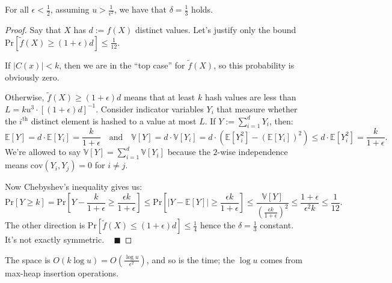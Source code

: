 \begin{claim}
    For all $\epsilon < \frac{1}{2}$, assuming $u > \frac{1}{\epsilon^2}$, we have that $\delta = \frac{1}{3}$ holds.
\end{claim}

\begin{proof}
    Say that $X$ has $d := f(X)$ distinct values.  Let's justify only the bound $\mathrm{Pr}\left [\tilde{f}(X) \geq (1 + \epsilon) d\right ] \leq \frac{1}{12}$.

    If $|C(x)| < k$, then we are in the ``top case'' for $\tilde{f}(X)$, so this probability is obviously zero.

    Otherwise, $\tilde{f}(X) \geq (1 + \epsilon) d$ means that at least $k$ hash values are less than $L = k u^3 \cdot \left [ (1 + \epsilon) d \right ]^{-1}$.  Consider indicator variables $Y_i$ that measure whether the $i^{\text{th}}$ distinct element is hashed to a value at most $L$.  If $Y := \sum_{i = 1}^d Y_i$, then:
    \[ \mathbb{E}[Y] = d \cdot \mathbb{E}[Y_i] = \dfrac{k}{1 + \epsilon} ~~~ \text{ and } ~~~ \mathbb{V}[Y] = d \cdot \mathbb{V}[Y_i] = d \cdot\left(\mathbb{E}[Y_i^2] - (\mathbb{E}[Y_i])^2\right) \leq d \cdot \mathbb{E}[Y_i^2] = \dfrac{k}{1 + \epsilon}. \]
    We're allowed to say $\mathbb{V}[Y] = \sum_{i = 1}^d \mathbb{V}[Y_i]$ because the $2$-wise independence means $\mathrm{cov}(Y_i, Y_j) = 0$ for $i \neq j$.

    Now Chebyshev's inequality gives us:
    \[ \mathrm{Pr}[Y \geq k] = \mathrm{Pr}\left [ Y - \dfrac{k}{1 + \epsilon} \geq \dfrac{\epsilon k}{1 + \epsilon} \right ] \leq \mathrm{Pr} \left [ |Y - \mathbb{E}[Y]| \geq \dfrac{\epsilon k}{1 + \epsilon} \right] \leq \dfrac{\mathbb{V}[Y]}{\left(\frac{\epsilon k}{1 + \epsilon}\right)^2}  \leq \dfrac{1 + \epsilon}{\epsilon^2k} \leq \dfrac{1}{12}. \]
    The other direction is $\mathrm{Pr}\left [\tilde{f}(X) \leq (1 + \epsilon) d\right ] \leq \frac{1}{4}$ hence the $\delta = \frac{1}{3}$ constant.  It's not exactly symmetric. ~ $\blacksquare$
\end{proof}

The space is $O(k \log u) = O\left(\frac{\log u}{\epsilon^2}\right)$, and so is the time; the $\log u$ comes from max-heap insertion operations.

